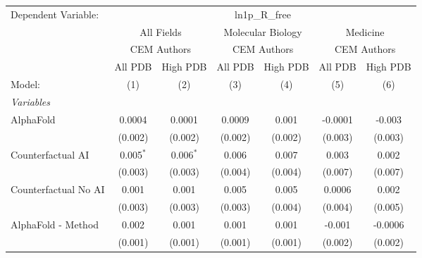 \begingroup
\centering
\begin{tabular}{lcccccc}
   \tabularnewline \midrule \midrule
   Dependent Variable: & \multicolumn{6}{c}{ln1p\_R\_free}\\
 & \multicolumn{2}{c}{All Fields} & \multicolumn{2}{c}{Molecular Biology} & \multicolumn{2}{c}{Medicine} \\
\cmidrule(lr){2-3} \cmidrule(lr){4-5} \cmidrule(lr){6-7}
 & \multicolumn{2}{c}{CEM Authors} & \multicolumn{2}{c}{CEM Authors} & \multicolumn{2}{c}{CEM Authors} \\
\cmidrule(lr){2-3} \cmidrule(lr){4-5} \cmidrule(lr){6-7}
 & \multicolumn{1}{c}{All PDB} & \multicolumn{1}{c}{High PDB} & \multicolumn{1}{c}{All PDB} & \multicolumn{1}{c}{High PDB} & \multicolumn{1}{c}{All PDB} & \multicolumn{1}{c}{High PDB} \\
\cmidrule(lr){2-2} \cmidrule(lr){3-3} \cmidrule(lr){4-4} \cmidrule(lr){5-5} \cmidrule(lr){6-6} \cmidrule(lr){7-7}
   Model:                                                     & (1)         & (2)         & (3)     & (4)     & (5)         & (6)\\  
   \midrule
   \emph{Variables}\\
   AlphaFold                                                  & 0.0004      & 0.0001      & 0.0009  & 0.001   & -0.0001     & -0.003\\   
                                                              & (0.002)     & (0.002)     & (0.002) & (0.002) & (0.003)     & (0.003)\\   
   Counterfactual AI                                          & 0.005$^{*}$ & 0.006$^{*}$ & 0.006   & 0.007   & 0.003       & 0.002\\   
                                                              & (0.003)     & (0.003)     & (0.004) & (0.004) & (0.007)     & (0.007)\\   
   Counterfactual No AI                                       & 0.001       & 0.001       & 0.005   & 0.005   & 0.0006      & 0.002\\   
                                                              & (0.003)     & (0.003)     & (0.003) & (0.004) & (0.004)     & (0.005)\\   
   AlphaFold - Method                                         & 0.002       & 0.001       & 0.001   & 0.001   & -0.001      & -0.0006\\   
                                                              & (0.001)     & (0.001)     & (0.001) & (0.001) & (0.002)     & (0.002)\\   

\end{tabular}
